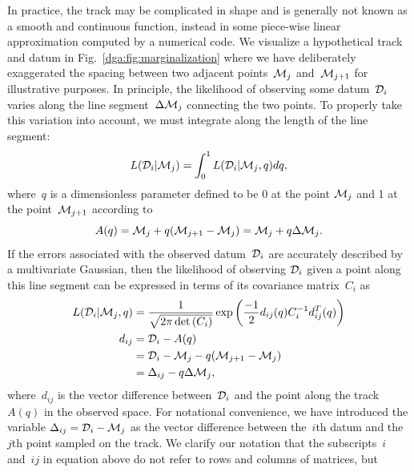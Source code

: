 In practice, the track may be complicated in shape and is generally not known
as a smooth and continuous function, instead in some piece-wise linear
approximation computed by a numerical code.
We visualize a hypothetical track and datum in Fig.~\ref{dga:fig:marginalization}
where we have deliberately exaggerated the spacing between two adjacent
points~$\mathcal{M}_j$ and~$\mathcal{M}_{j + 1}$ for illustrative purposes.
In principle, the likelihood of observing some datum~$\mathcal{D}_i$ varies
along the line segment~$\Delta\mathcal{M}_j$ connecting the two points.
To properly take this variation into account, we must integrate along the
length of the line segment:
\begin{equation}
L(\mathcal{D}_i | \mathcal{M}_j) = \int_0^1 L(\mathcal{D}_i | \mathcal{M}_j, q) dq,
\label{dga:eq:l_int_q}
\end{equation}
where~$q$ is a dimensionless parameter defined to be 0 at the point
$\mathcal{M}_j$ and 1 at the point~$\mathcal{M}_{j + 1}$ according to
\begin{equation}
A(q) = \mathcal{M}_j + q(\mathcal{M}_{j + 1} - \mathcal{M}_j)
= \mathcal{M}_j + q\Delta\mathcal{M}_j.
\end{equation}
If the errors associated with the observed datum~$\mathcal{D}_i$ are accurately
described by a multivariate Gaussian, then the likelihood of observing
$\mathcal{D}_i$ given a point along this line segment can be expressed in terms
of its covariance matrix~$C_i$ as
\begin{subequations}\begin{align}
L(\mathcal{D}_i | \mathcal{M}_j, q) &=
\frac{1}{\sqrt{2\pi \det{(C_i)}}}
\exp\left(\frac{-1}{2} d_{ij}(q) C_i^{-1} d_{ij}^T(q)\right)
\label{dga:eq:l_di_mj_q}
\\
d_{ij} &= \mathcal{D}_i - A(q)
\\
&= \mathcal{D}_i - \mathcal{M}_j - q(\mathcal{M}_{j + 1} - \mathcal{M}_j)
\\
&= \Delta_{ij} - q\Delta \mathcal{M}_j,
\label{dga:eq:delta_minus_qmj}
\end{align}\end{subequations}
where~$d_{ij}$ is the vector difference between~$\mathcal{D}_i$ and the
point along the track~$A(q)$ in the observed space.
For notational convenience, we have introduced the variable
$\Delta_{ij} = \mathcal{D}_i - \mathcal{M}_j$ as the vector difference between
the~$i$th datum and the~$j$th point sampled on the track.
We clarify our notation that the subscripts~$i$ and~$ij$ in equation
 above do not refer to rows and columns of matrices, but
